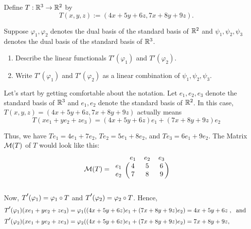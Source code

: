 \begin{xrcs}
  Define $T: \mathbb{R}^3 \to \mathbb{R}^2$ by
  \begin{equation}
    T(x, y, z) := (4x + 5y + 6z, 7x + 8y + 9z).
  \end{equation}

  Suppose $\varphi_1, \varphi_2$ denotes the dual basis of the standard basis of $\mathbb{R}^2$ and $\psi_1, \psi_2, \psi_3$ denotes the dual basis of the standard basis of $\mathbb{R}^3$.
  \begin{enumerate}
    \item Describe the linear functionals $T'(\varphi_1)$ and $T'(\varphi_2)$.
    \item Write $T'(\varphi_1)$ and $T'(\varphi_2)$ as a linear combination of $\psi_1, \psi_2, \psi_3$.
  \end{enumerate}

  \begin{xsol}
    Let's start by getting comfortable about the notation. Let $e_1, e_2, e_3$ denote the standard basis of $\mathbb{R}^3$ and $e_1, e_2$ denote the standard basis of $\mathbb{R}^2$. In this case, $T(x, y, z) = (4x + 5y + 6z, 7x + 8y + 9z)$ actually means
    \begin{equation}
      T(x e_1 + y e_2 + z e_3) = (4x + 5y + 6z) e_1 + (7x + 8y + 9z) e_2
    \end{equation}

    Thus, we have $T e_1 = 4e_1 + 7 e_2$, $T e_2 = 5e_1 + 8e_2$, and $T e_3 = 6e_1 + 9 e_2$. The Matrix $\mathcal{M}(T)$ of $T$ would look like this:
    \begin{equation}
      \mathcal{M} (T) =
      \begin{blockarray}{cccc}
        & e_1 & e_2 & e_3  \\
        \begin{block}{c(ccc)}
          e_1 & 4   & 5   & 6    \\
          e_2 & 7   & 8   & 9    \\
        \end{block}
      \end{blockarray}
    \end{equation}

    Now, $\dual{T} (\varphi_1) = \varphi_1 \circ T$ and $\dual{T} (\varphi_2) = \varphi_2 \circ T$. Hence,
    \begin{equation}
      \begin{aligned}
        &\dual{T} (\varphi_1) (x e_1 + y e_2 + z e_3) = \varphi_1 ((4x + 5y + 6z) e_1 + (7x + 8y + 9z) e_2 ) = 4x + 5y + 6z \;, \; \text{ and } \\
        &\dual{T} (\varphi_2) (x e_1 + y e_2 + z e_3) = \varphi_2 ((4x + 5y + 6z) e_1 + (7x + 8y + 9z) e_2 ) = 7x + 8y + 9z,
      \end{aligned}
    \end{equation}


\end{xsol}
\end{xrcs}

